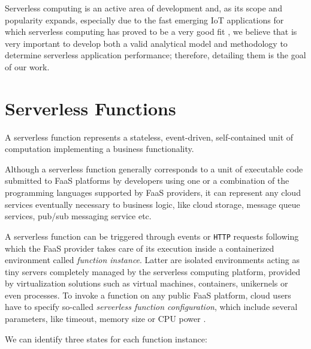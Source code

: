 \documentclass[12pt,a4paper]{report}
\begin{document}
Serverless computing is an active area of development and, as its scope and popularity expands, especially due to the fast emerging IoT applications for which serverless computing has proved to be a very good fit \cite{IoTFaaS}, we believe that is very important to develop both a valid analytical model and methodology to determine serverless application performance; therefore, detailing them is the goal of our work.

\section{Serverless Functions}

A serverless function represents a stateless, event-driven, self-contained unit of computation implementing a business functionality.

Although a serverless function generally corresponds to a unit of executable code submitted to FaaS platforms by developers using one or a combination of the programming languages supported by FaaS providers, it can represent any cloud services eventually necessary to business logic, like cloud storage, message queue services, pub/sub messaging service etc.

A serverless function can be triggered through events or \texttt{HTTP} requests following which the FaaS provider takes care of its execution inside a containerized environment called \textit{function instance}. Latter are isolated environments acting as tiny servers completely managed by the serverless computing platform, provided by virtualization solutions such as virtual machines, containers, unikernels or even processes. To invoke a function on any public FaaS platform, cloud users have to specify so-called \textit{serverless function configuration}, which include several parameters, like timeout, memory size or CPU power \cite{COSE}.

We can identify three states for each function instance:
\end{document}
